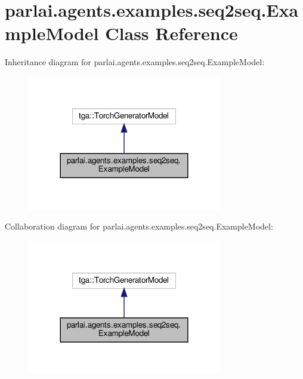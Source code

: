 \hypertarget{classparlai_1_1agents_1_1examples_1_1seq2seq_1_1ExampleModel}{}\section{parlai.\+agents.\+examples.\+seq2seq.\+Example\+Model Class Reference}
\label{classparlai_1_1agents_1_1examples_1_1seq2seq_1_1ExampleModel}


Inheritance diagram for parlai.\+agents.\+examples.\+seq2seq.\+Example\+Model\+:
\nopagebreak
\begin{figure}[H]
\begin{center}
\leavevmode
\includegraphics[width=240pt]{de/d53/classparlai_1_1agents_1_1examples_1_1seq2seq_1_1ExampleModel__inherit__graph}
\end{center}
\end{figure}


Collaboration diagram for parlai.\+agents.\+examples.\+seq2seq.\+Example\+Model\+:
\nopagebreak
\begin{figure}[H]
\begin{center}
\leavevmode
\includegraphics[width=240pt]{db/d08/classparlai_1_1agents_1_1examples_1_1seq2seq_1_1ExampleModel__coll__graph}
\end{center}
\end{figure}
